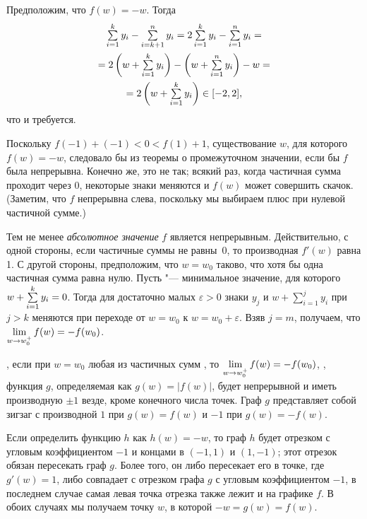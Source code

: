 \documentclass[twoside]{book}
\begin{document}
Предположим, что $f(w)=-w$.
Тогда
\begin{multline*}
\mathop{\textstyle\sum}\limits_{i=1}^{k}y_i-\mathop{\textstyle\sum}\limits_{i=k+1}^{n}y_i=
2\mathop{\textstyle\sum}\limits_{i=1}^{k}y_i-\mathop{\textstyle\sum}\limits_{i=1}^{n}y_i=\\=
2\left(w+\mathop{\textstyle\sum}\limits_{i=1}^{k}y_i\right)-\left(w+\mathop{\textstyle\sum}\limits_{i=1}^{n}y_i\right)-w=\\=
2\left(w+\mathop{\textstyle\sum}\limits_{i=1}^{k}y_i\right)\in[-2,2],
\end{multline*}
что и требуется.

Поскольку  $f(-1)+(-1)<0 <f(1)+ 1$, существование $w$, для которого $f(w)=-w$, следовало бы из теоремы о промежуточном значении, если бы  $f$ была непрерывна.
Конечно же, это не так; всякий раз, когда частичная сумма проходит через 0, некоторые знаки меняются и $f(w)$ может совершить скачок.
(Заметим, что $f$ непрерывна слева, поскольку мы выбираем плюс при нулевой частичной сумме.)

Тем не менее \emph{абсолютное значение}  $f$ является непрерывным.
Действительно, с одной стороны, если частичные суммы не равны~$0$, то производная $f'(w)$ равна 1.
С другой стороны, предположим, что $w=w_0$ таково, что хотя бы одна частичная сумма равна нулю.
Пусть  "--- минимальное значение, для которого $w+\sum\limits_{i=1}^{k}y_i\z=0$.
Тогда для достаточно малых $\varepsilon>0$
знаки  $y_j$ и $w+\sum\limits_{i=1}^{j}y_i$ при $j>k$ меняются при переходе от $w=w_0$ к $w=w_0+\varepsilon$.
Взяв $j = m$, получаем, что $\lim\limits_{w\to w_0^+}f(w)\z=-f(w_0)$.

, если при $w=w_0$ любая из частичных сумм , то $\lim\limits_{w\to w_0^+}f(w)\z=-f(w_0)$, , функция $g$, определяемая как $g(w) =|f(w)|$, будет непрерывной и иметь производную $\pm1$ везде, кроме конечного числа точек.
Граф $g$ представляет собой зигзаг с производной $1$ при $g(w)=f(w)$ и $-1$ при $g(w)=-f(w)$.

Если определить функцию $h$ как $h (w) = -w$, то граф $h$ будет отрезком с угловым коэффициентом $-1$ и концами в  $(-1,1)$ и $(1,-1)$;
этот отрезок обязан пересекать граф $g$.
Более того, он либо пересекает его в точке, где $g'(w) = 1$, либо совпадает с отрезком графа $g$ с угловым коэффициентом $-1$, в последнем случае самая левая точка отрезка также лежит и на графике  $f$.
В обоих случаях мы получаем точку $w$, в которой $-w = g (w) = f (w)$. \heart
\end{document}
